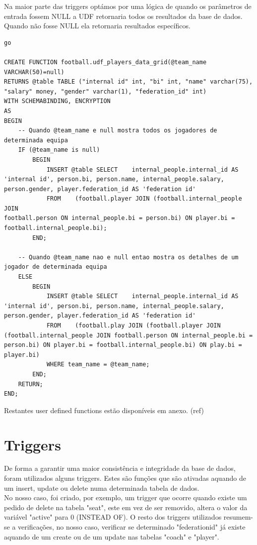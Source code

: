 \documentclass[pdftex,12pt,a4paper]{report}
\begin{document}
Na maior parte das triggers optámos por uma lógica de quando os parâmetros de entrada fossem NULL a UDF retornaria todos os resultados da base de dados. Quando não fosse NULL ela retornaria resultados específicos.


\begin{lstlisting}
go

CREATE FUNCTION football.udf_players_data_grid(@team_name VARCHAR(50)=null)
RETURNS @table TABLE ("internal id" int, "bi" int, "name" varchar(75), "salary" money, "gender" varchar(1), "federation_id" int)
WITH SCHEMABINDING, ENCRYPTION
AS
BEGIN
	-- Quando @team_name e null mostra todos os jogadores de determinada equipa
	IF (@team_name is null)
		BEGIN
			INSERT @table SELECT	internal_people.internal_id AS 'internal id', person.bi, person.name, internal_people.salary, person.gender, player.federation_id AS 'federation id'
			FROM	(football.player JOIN (football.internal_people JOIN
football.person ON internal_people.bi = person.bi) ON player.bi = football.internal_people.bi);
		END;
		
	-- Quando @team_name nao e null entao mostra os detalhes de um jogador de determinada equipa
	ELSE
		BEGIN
			INSERT @table SELECT	internal_people.internal_id AS 'internal id', person.bi, person.name, internal_people.salary, person.gender, player.federation_id AS 'federation id'
			FROM	(football.play JOIN	(football.player JOIN (football.internal_people JOIN football.person ON internal_people.bi = person.bi) ON player.bi = football.internal_people.bi) ON play.bi = player.bi)
			WHERE team_name = @team_name;
		END;
	RETURN;
END;
\end{lstlisting}
 \vspace{0,5in}

Restantes user defined functions estão disponíveis em anexo. (ref)

\section{Triggers}
De forma a garantir uma maior consistência e integridade da base de dados, foram utilizados alguns triggers. Estes são funções que são ativadas aquando de um insert, update ou delete numa determinada tabela de dados.
\\

No nosso caso, foi criado, por exemplo, um  trigger que ocorre quando existe um pedido de delete na tabela "seat", este em vez de ser removido, altera o valor da variável "active" para 0 (INSTEAD OF).
O resto dos triggers utilizados resumem-se a verificações, no nosso caso, verificar se determinado "federation{\textunderscore}id" já existe aquando de um create ou de um update nas tabelas "coach" e "player".
\end{document}
